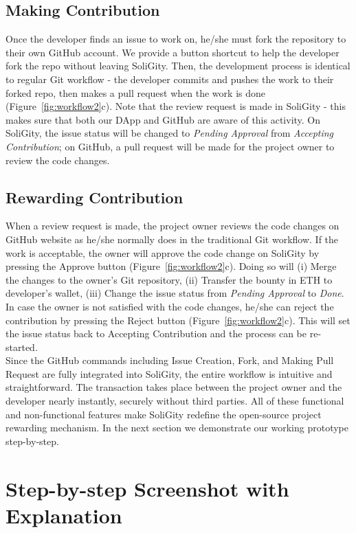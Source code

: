 \documentclass[12pt]{article}
\renewcommand{\_}{\kern-1.5pt\textunderscore\kern-1.5pt}
\begin{document}
\subsection{Making Contribution}

Once the developer finds an issue to work on, he/she must fork the repository to their own GitHub account. We provide a button shortcut to help the developer fork the repo without leaving SoliGity. Then, the development process is identical to regular Git workflow - the developer commits and pushes the work to their forked repo, then makes a pull request when the work is done (Figure~\ref{fig:workflow2}c). Note that the review request is made in SoliGity - this makes sure that both our DApp and GitHub are aware of this activity. On SoliGity, the issue status will be changed to \textit{Pending Approval} from \textit{Accepting Contribution}; on GitHub, a pull request will be made for the project owner to review the code changes.

\subsection{Rewarding Contribution}
When a review request is made, the project owner reviews the code changes on GitHub website as he/she normally does in the traditional Git workflow. If the work is acceptable, the owner will approve the code change on SoliGity by pressing the Approve button (Figure~\ref{fig:workflow2}c). Doing so will (i) Merge the changes to the owner’s Git repository,
(ii) Transfer the bounty in ETH to developer’s wallet,
(iii) Change the issue status from \textit{Pending Approval} to \textit{Done}. In case the owner is not satisfied with the code changes, he/she can reject the contribution by pressing the Reject button (Figure~\ref{fig:workflow2}c). This will set the issue status back to Accepting Contribution and the process can be re-started.  \\


\noindent Since the GitHub commands including Issue Creation, Fork, and Making Pull Request are fully integrated into SoliGity, the entire workflow is intuitive and straightforward. The transaction takes place between the project owner and the developer nearly instantly, securely without third parties. All of these functional and non-functional features make SoliGity redefine the open-source project rewarding mechanism. In the next section we demonstrate our working prototype step-by-step.

\section{Step-by-step Screenshot with Explanation}
\end{document}
